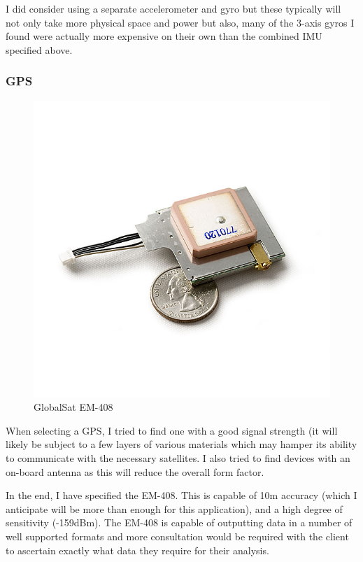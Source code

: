 \documentclass[a4paper, twoside]{article}
\begin{document}
I did consider using a separate accelerometer and gyro but these typically will
not only take more physical space and power but also, many of the 3-axis gyros I
found were actually more expensive on their own than the combined IMU specified
above.

\subsubsection{GPS}
\begin{figure}
	\vspace{-35pt}
	\begin{center}
		\includegraphics[scale=0.2]{images/em-408.jpg}
	\end{center}
	\vspace{-20pt}
	\caption{GlobalSat EM-408}
\end{figure}

When selecting a GPS, I tried to find one with a good signal strength (it will
likely be subject to a few layers of various materials which may hamper its
ability to communicate with the necessary satellites. I also tried to find
devices with an on-board antenna as this will reduce the overall form factor.

In the end, I have specified the EM-408. This is capable of 10m accuracy (which
I anticipate will be more than enough for this application), and a high degree of
sensitivity (-159dBm). The EM-408 is capable of outputting data in a number of
well supported formats and more consultation would be required with the client
to ascertain exactly what data they require for their analysis.
\end{document}
